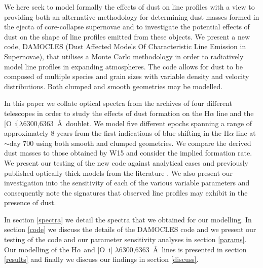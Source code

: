 \documentclass[useAMS,usenatbib,usegraphicx]{mnras}
\begin{document}
We here seek to model formally the effects of dust on line profiles with a 
view to providing both an alternative methodology for determining dust 
masses formed in the ejecta of core-collapse supernovae and to investigate 
the potential effects of dust on the shape of line profiles emitted from 
these objects.  We present a new code, DAMOCLES (Dust Affected Models Of 
Characteristic Line Emission in Supernovae), that utilises a Monte Carlo 
methodology in order to radiatively model line profiles in expanding 
atmospheres.  The code allows for dust to be composed of multiple species 
and grain sizes with variable density and velocity distributions.  Both 
clumped and smooth geometries may be modelled.

In this paper we collate optical spectra from the archives of four 
different telescopes in order to study the effects of dust formation on 
the H$\alpha$ line and the [O~{\sc i}]$\lambda$6300,6363~\AA\ doublet.  
We model five different epochs spanning a range of approximately 8 years 
from the first indications of blue-shifting in the H$\alpha$ line at 
$\sim$day 700 using both smooth and clumped geometries.  We compare the 
derived dust masses to those obtained by W15 and consider the implied 
formation rate.  We present our testing of the new code against 
analytical cases and previously published optically thick models from 
the literature \citep{Lucy1989a}. We also present our investigation into 
the sensitivity of each of the various variable parameters and 
consequently note the signatures that observed line profiles may exhibit 
in the presence of dust.

In section \ref{spectra} we detail the spectra that we obtained for our 
modelling.  In section \ref{code} we discuss the details of the DAMOCLES 
code and we present our testing of the code and our parameter sensitivity 
analyses in section \ref{params}.  Our modelling of the H$\alpha$ and 
[O~{\sc i}] $\lambda$6300,6363~\AA\ lines is presented in section 
\ref{results} and finally we discuss our findings in section \ref{discuss}.


\end{document}
